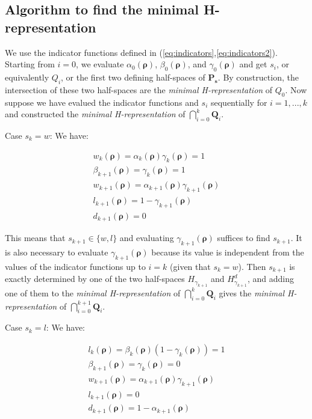 \documentclass[11pt]{article}
\numberwithin{equation}{section}
\numberwithin{figure}{section}
\numberwithin{table}{section}
\begin{document}
\subsection{Algorithm to find the minimal H-representation}\label{sec:minHrepresentation}

We use the indicator functions defined in (\ref{eq:indicators},\ref{eq:indicators2}). Starting from $i=0$, we evaluate $\alpha_{0}(\boldsymbol\rho)$, $\beta_{0}(\boldsymbol\rho)$, and $\gamma_{0}(\boldsymbol\rho)$ and get $s_{i}$, or equivalently $Q_{i}$, or the first two defining half-spaces of $\textbf{P}_{\boldsymbol s}$. By construction, the intersection of these two half-spaces are the \textit{minimal H-representation} of $Q_{0}$. Now suppose we have evalued the indicator functions and $s_{i}$ sequentially for $i=1,...,k$ and constructed the \textit{minimal H-representation} of $\bigcap_{i=0}^{k} \textbf{Q}_{i}$.

Case $s_{k}=w$: We have:

\begin{equation}
\begin{array}{l}
w_{k}(\boldsymbol\rho)=\alpha_{k}(\boldsymbol\rho)\gamma_{k}(\boldsymbol\rho)=1\\
\beta_{k+1}(\boldsymbol\rho)=\gamma_{k}(\boldsymbol\rho)=1\\
w_{k+1}(\boldsymbol\rho)=\alpha_{k+1}(\boldsymbol\rho)\gamma_{k+1}(\boldsymbol\rho)\\
l_{k+1}(\boldsymbol\rho)=1-\gamma_{k+1}(\boldsymbol\rho)\\
d_{k+1}(\boldsymbol\rho)=0
\end{array}
\end{equation}

\noindent This means that $s_{k+1}\in\{w,l\}$ and evaluating $\gamma_{k+1}(\boldsymbol\rho)$ suffices to find $s_{k+1}$. It is also necessary to evaluate $\gamma_{k+1}(\boldsymbol\rho)$ because its value is independent from the values of the indicator functions up to $i=k$ (given that $s_{k}=w$). Then $s_{k+1}$ is exactly determined by one of the two half-spaces $H_{\gamma_{k+1}}$ and $H^{d}_{\gamma_{k+1}}$, and adding one of them to the \textit{minimal H-representation} of $\bigcap_{i=0}^{k} \textbf{Q}_{i}$ gives the \textit{minimal H-representation} of $\bigcap_{i=0}^{k+1} \textbf{Q}_{i}$.

Case $s_{k}=l$: We have:

\begin{equation}
\begin{array}{l}
l_{k}(\boldsymbol\rho)=\beta_{k}(\boldsymbol\rho)(1-\gamma_{k}(\boldsymbol\rho))=1\\
\beta_{k+1}(\boldsymbol\rho)=\gamma_{k}(\boldsymbol\rho)=0\\
w_{k+1}(\boldsymbol\rho)=\alpha_{k+1}(\boldsymbol\rho)\gamma_{k+1}(\boldsymbol\rho)\\
l_{k+1}(\boldsymbol\rho)=0\\
d_{k+1}(\boldsymbol\rho)=1-\alpha_{k+1}(\boldsymbol\rho)
\end{array}
\end{equation}
\end{document}
